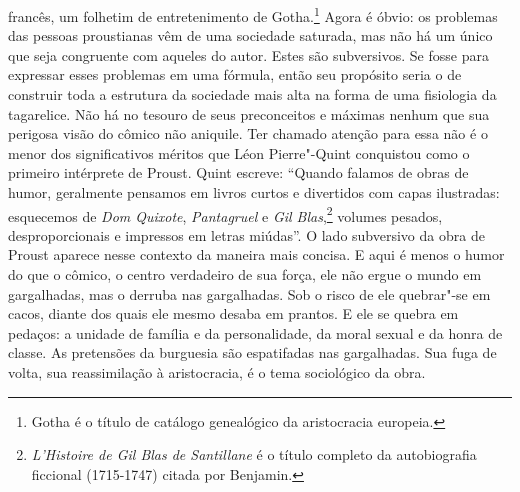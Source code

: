 francês, um folhetim de entretenimento de Gotha.\footnote{Gotha é o
  título de catálogo genealógico da aristocracia europeia. \versal{[N. E.]}} Agora é
óbvio: os problemas das pessoas proustianas vêm de uma sociedade
saturada, mas não há um único que seja congruente com aqueles do autor.
Estes são subversivos. Se fosse para expressar esses problemas em uma
fórmula, então seu propósito seria o de construir toda a estrutura da
sociedade mais alta na forma de uma fisiologia da tagarelice. Não há no
tesouro de seus preconceitos e máximas nenhum que sua perigosa visão do
cômico não aniquile. Ter chamado atenção para essa não é o menor dos
significativos méritos que Léon Pierre"-Quint conquistou como o primeiro
intérprete de Proust. Quint escreve: ``Quando falamos de obras de humor,
geralmente pensamos em livros curtos e divertidos com capas ilustradas:
esquecemos de \emph{Dom Quixote}, \emph{Pantagruel} e \emph{Gil Blas},\footnote{\emph{L'Histoire de Gil Blas de Santillane} é o título completo da
  autobiografia ficcional (1715-1747) citada por Benjamin. \versal{[N. T.]}} volumes
pesados, desproporcionais e impressos em letras miúdas''. O lado
subversivo da obra de Proust aparece nesse contexto da maneira mais
concisa. E aqui é menos o humor do que o cômico, o centro verdadeiro de
sua força, ele não ergue o mundo em gargalhadas, mas o derruba nas
gargalhadas. Sob o risco de ele quebrar"-se em cacos, diante dos quais
ele mesmo desaba em prantos. E ele se quebra em pedaços: a unidade de
família e da personalidade, da moral sexual e da honra de classe. As
pretensões da burguesia são espatifadas nas gargalhadas. Sua fuga de
volta, sua reassimilação à aristocracia, é o tema sociológico da obra.


